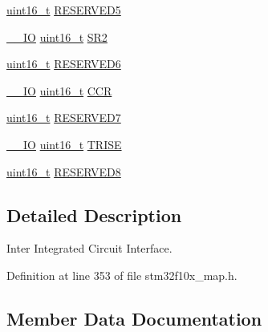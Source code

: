 \begin{DoxyCompactItemize}
\hyperlink{_p_e___types_8h_a1f1825b69244eb3ad2c7165ddc99c956}{uint16\+\_\+t} \hyperlink{struct_i2_c___type_def_ae736412dcff4daa38bfa8bf8628df316}{R\+E\+S\+E\+R\+V\+E\+D5}
\item 
\hyperlink{group___c_m_s_i_s___c_m3__core__definitions_gaec43007d9998a0a0e01faede4133d6be}{\+\_\+\+\_\+\+IO} \hyperlink{_p_e___types_8h_a1f1825b69244eb3ad2c7165ddc99c956}{uint16\+\_\+t} \hyperlink{struct_i2_c___type_def_a95c7f729b10eb2acafe499d9c9a81a83}{S\+R2}
\item 
\hyperlink{_p_e___types_8h_a1f1825b69244eb3ad2c7165ddc99c956}{uint16\+\_\+t} \hyperlink{struct_i2_c___type_def_aaf1b319262f53669f49e244d94955a60}{R\+E\+S\+E\+R\+V\+E\+D6}
\item 
\hyperlink{group___c_m_s_i_s___c_m3__core__definitions_gaec43007d9998a0a0e01faede4133d6be}{\+\_\+\+\_\+\+IO} \hyperlink{_p_e___types_8h_a1f1825b69244eb3ad2c7165ddc99c956}{uint16\+\_\+t} \hyperlink{struct_i2_c___type_def_a1775e779008da2b4d1807c2b5033b8a5}{C\+CR}
\item 
\hyperlink{_p_e___types_8h_a1f1825b69244eb3ad2c7165ddc99c956}{uint16\+\_\+t} \hyperlink{struct_i2_c___type_def_a0f398bdcc3f24e7547c3cb9343111fd0}{R\+E\+S\+E\+R\+V\+E\+D7}
\item 
\hyperlink{group___c_m_s_i_s___c_m3__core__definitions_gaec43007d9998a0a0e01faede4133d6be}{\+\_\+\+\_\+\+IO} \hyperlink{_p_e___types_8h_a1f1825b69244eb3ad2c7165ddc99c956}{uint16\+\_\+t} \hyperlink{struct_i2_c___type_def_aaba7a808e4dfae5cc06b197c298af206}{T\+R\+I\+SE}
\item 
\hyperlink{_p_e___types_8h_a1f1825b69244eb3ad2c7165ddc99c956}{uint16\+\_\+t} \hyperlink{struct_i2_c___type_def_a6e762751c9d5a1e41efb6033a26d8ed8}{R\+E\+S\+E\+R\+V\+E\+D8}
\end{DoxyCompactItemize}


\subsection{Detailed Description}
Inter Integrated Circuit Interface. 

Definition at line 353 of file stm32f10x\+\_\+map.\+h.



\subsection{Member Data Documentation}
